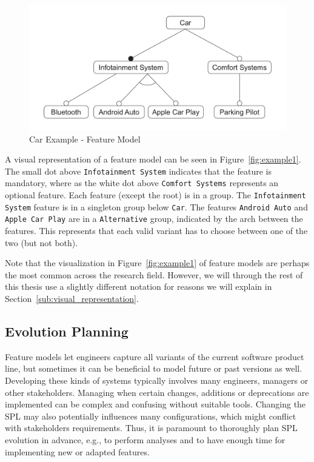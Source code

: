 \documentclass[a4paper,english]{ifimaster}
\begin{document}
\begin{figure}[htpb]
	\centering
	\includegraphics[width=0.8\linewidth]{illustrations/example.pdf}
	\caption{Car Example - Feature Model}%
	\label{fig:example1}
\end{figure}

A visual representation of a feature model can be seen in Figure~\vref{fig:example1}. The small dot above \texttt{Infotainment System} indicates that the feature is mandatory, where as the white dot above \texttt{Comfort Systems} represents an optional feature. Each feature (except the root) is in a group. The \texttt{Infotainment System} feature is in a singleton group below \texttt{Car}. The features \texttt{Android Auto} and \texttt{Apple Car Play} are in a \texttt{Alternative} group, indicated by the arch between the features. This represents that each valid variant has to choose between one of the two (but not both).

Note that the visualization in Figure~\vref{fig:example1} of feature models are perhaps the most common across the research field. However, we will through the rest of this thesis use a slightly different notation for reasons we will explain in Section~\vref{sub:visual_representation}.

\subsection{Evolution Planning}%
\label{sub:evolution_planning}

Feature models let engineers capture all variants of the current software product line, but sometimes it can be beneficial to model future or past versions as well. Developing these kinds of systems typically involves many engineers, managers or other stakeholders. Managing when certain changes, additions or deprecations are implemented can be complex and confusing without suitable tools. Changing the SPL may also potentially influences many configurations, which might conflict with stakeholders requirements. Thus, it is paramount to thoroughly plan SPL evolution in advance, e.g., to perform analyses and to have enough time for implementing new or adapted features.
\end{document}
